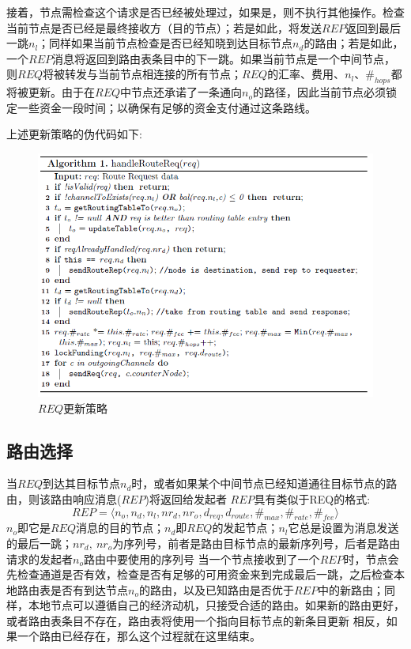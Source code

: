 \documentclass[12pt,a4paper]{article}
\begin{document}
接着，节点需检查这个请求是否已经被处理过，如果是，则不执行其他操作。检查当前节点是否已经是最终接收方（目的节点）；若是如此，将发送$REP$返回到最后一跳$n_l$；同样如果当前节点检查是否已经知晓到达目标节点$n_d$的路由；若是如此，一个$REP$消息将返回到路由表条目中的下一跳。如果当前节点是一个中间节点，则$REQ$将被转发与当前节点相连接的所有节点；$REQ$的汇率、费用、$n_l$、$\#_{hops}$都将被更新。由于在$REQ$中节点还承诺了一条通向$n_o$的路径，因此当前节点必须锁定一些资金一段时间；以确保有足够的资金支付通过这条路线。

上述更新策略的伪代码如下:
\begin{figure}[htb]
\centering
\includegraphics[width=14cm]{req_update}
\caption{$REQ$更新策略}
\end{figure}

\subsection{路由选择}
当$REQ$到达其目标节点$n_d$时，或者如果某个中间节点已经知道通往目标节点的路由，则该路由响应消息($REP$)将返回给发起者
$REP$具有类似于REQ的格式:
\begin{equation}
REP=\langle n_o, n_d, n_l, {nr}_d, {nr}_o, d_{req},d_{route}, \#_{max}, \#_{rate},\#_{fee}\rangle
\end{equation}
$n_o$即它是$REQ$消息的目的节点；$n_d$即$REQ$的发起节点；$n_l$它总是设置为消息发送的最后一跳；${nr}_d,\ {nr}_o$为序列号，前者是路由目标节点的最新序列号，后者是路由请求的发起者$n_o$路由中要使用的序列号
当一个节点接收到了一个$REP$时，节点会先检查通道是否有效，检查是否有足够的可用资金来到完成最后一跳，之后检查本地路由表是否有到达节点$n_o$的路由，以及已知路由是否优于$REP$中的新路由；同样，本地节点可以遵循自己的经济动机，只接受合适的路由。如果新的路由更好，或者路由表条目不存在，路由表将使用一个指向目标节点的新条目更新
相反，如果一个路由已经存在，那么这个过程就在这里结束。
\end{document}
